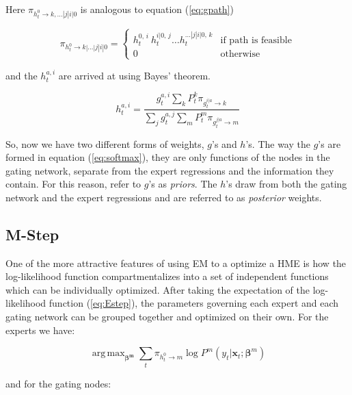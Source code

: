 \documentclass[12pt]{article}
\newcommand{\gateprod}[2]{\pi_{#1 \longrightarrow #2}}
\newcommand{\shortsum}[1]{\sum \nolimits_{#1}}
\newcommand{\h}[2]{h^{#1}_{#2}}
\DeclareMathOperator*{\argmax}{arg\,max}
\begin{document}
Here $\gateprod{h^{0}_{t}}{k,\dots|j|i|0}$ is analogous to equation (\ref{eq:gpath})

\begin{equation} \label{eq:hpath}
  \gateprod{h^{0}_{t}}{k|\ldots|j|i|0} =
    \begin{cases} 
       h^{0, \, i}_{t} \ h^{i|0, \, j}_{t} \ldots h^{\dots|j|i|0, \, k}_{t} & \textrm{if path is feasible} \\
       0 & \textrm{otherwise}
    \end{cases}
\end{equation}

and the $h^{a, i}_{t}$ are arrived at using Bayes' theorem.

\begin{equation} \label{eq:posteriornode}
  \h{a,i}{t} = \frac{g^{a, i}_{t} \shortsum{k} P^{k}_{t} \gateprod{g^{i|a}_{t}}{k}}{\shortsum{j} g^{a, j}_{t} \shortsum{m} P^{m}_{t} \gateprod{g^{j|a}_{t}}{m}}
\end{equation}


So, now we have two different forms of weights, $g$'s and $h$'s. The
way the $g$'s are formed in equation (\ref{eq:softmax}), they are only
functions of the nodes in the gating network, separate from the
expert regressions and the information they contain. For this reason,
\citet{JordanJacobs1993} refer to $g$'s as \textit{priors}.
The $h$'s draw from both the gating network and the expert regressions and
are referred to as \textit{posterior} weights.


\subsection{M-Step} \label{sec:Mstep}

One of the more attractive features of using EM to a optimize a
HME is how the log-likelihood function compartmentalizes into a set 
of independent functions which can be individually optimized. After
taking the expectation of the log-likelihood function (\ref{eq:Estep}), the
parameters governing each expert and each gating network can be grouped
together and optimized on their own. For the experts we have:

\begin{equation} \label{eq:BetaUpdate}
  \argmax_{\boldsymbol{\beta^{m}}} \sum_{t} \gateprod{h^{0}_{t}}{m} \log P^{m} (y_{t}| \boldsymbol{x}_{t}; \boldsymbol{\beta}^{m})
\end{equation}

and for the gating nodes:
\end{document}
